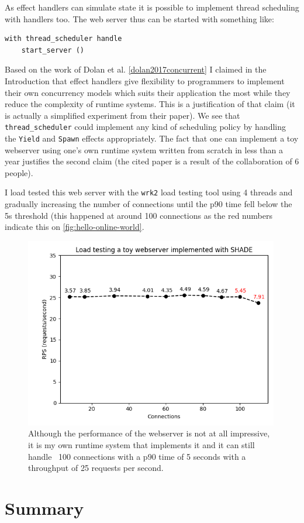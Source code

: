 \documentclass[class=article, crop=false]{standalone}
\begin{document}
As effect handlers can simulate state it is possible to implement thread
scheduling with handlers too. The web server
thus can be started with something like:
\begin{verbatim}
with thread_scheduler handle
    start_server ()
\end{verbatim}
Based on the work of Dolan et al. \autoref{dolan2017concurrent} I claimed in
the Introduction that effect handlers give flexibility to programmers to
implement their own concurrency models which suits their application the most
while they reduce the complexity of runtime systems. This is a justification of
that claim (it is actually a simplified experiment from their paper). We see
that \verb|thread_scheduler| could implement any kind of scheduling policy by
handling the \verb|Yield| and \verb|Spawn| effects appropriately. The fact that
one can implement a toy webserver using one's own runtime system written from
scratch in less than a year justifies the second claim (the cited paper is a
result of the collaboration of 6 people).

I load tested this web server with the \lstinline|wrk2| load testing tool
\cite{wrk2-website} using 4 threads and gradually increasing the number of
connections until the p90 time fell below the 5s threshold (this happened at
around 100 connections as the red numbers indicate this on
\autoref{fig:hello-online-world}.

\begin{figure}
    \centering
    \includegraphics[width=30em]{eval_plots/webserver.png}
    \caption{Although the performance of the webserver is not at all impressive,
    it is my own runtime system that implements it and it can still handle ~100
    connections with a p90 time of 5 seconds with a throughput of 25 requests
    per second.}
    \label{fig:hello-online-world}
\end{figure}

\section{Summary}
\end{document}
